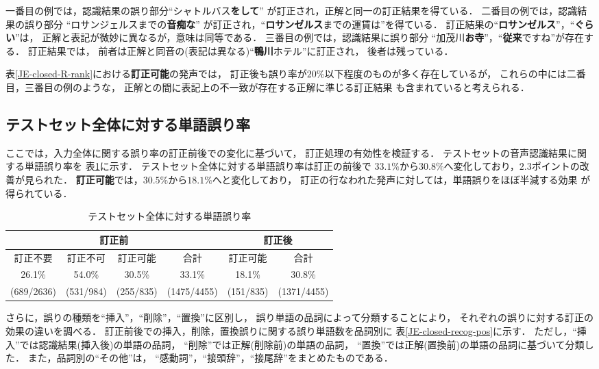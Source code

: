 一番目の例では，認識結果の誤り部分``シャトルバス{\bf をして}''
が訂正され，正解と同一の訂正結果を得ている．
二番目の例では，認識結果の誤り部分
``ロサンジェルスまでの{\bf 音痴な}''
が訂正され，``{\bf ロサンゼルス}までの運賃は''を得ている．
訂正結果の``{\bf ロサンゼルス}''，``{\bf ぐらい}''は，
正解と表記が微妙に異なるが，意味は同等である．
三番目の例では，認識結果に誤り部分
``加茂川{\bf お寺}''，``{\bf 従来}ですね''が存在する．
訂正結果では，
前者は正解と同音の(表記は異なる)``{\bf 鴨川}ホテル''に訂正され，
後者は残っている．

表\ref{JE-closed-R-rank}における{\bf 訂正可能}の発声では，
訂正後も誤り率が$20\%$以下程度のものが多く存在しているが，
これらの中には二番目，三番目の例のような，
正解との間に表記上の不一致が存在する正解に準じる訂正結果
も含まれていると考えられる．


\subsection{テストセット全体に対する単語誤り率}

ここでは，入力全体に関する誤り率の訂正前後での変化に基づいて，
訂正処理の有効性を検証する．
テストセットの音声認識結果に関する単語誤り率を
表\ref{JE-closed-dp-total}に示す．
テストセット全体に対する単語誤り率は訂正の前後で
$33.1\%$から$30.8\%$へ変化しており，$2.3$ポイントの改善が見られた．
{\bf 訂正可能}では，$30.5\%$から$18.1\%$へと変化しており，
訂正の行なわれた発声に対しては，単語誤りをほぼ半減する効果
が得られている．

\begin{table}
\begin{center}
\caption{テストセット全体に対する単語誤り率}
\begin{tabular}{|c|c|c||c||c||c|} \hline
\multicolumn{4}{|c||}{訂正前} & \multicolumn{2}{c|}{訂正後} \\ \hline
訂正不要  & 訂正不可 & 訂正可能 & 合計 & 訂正可能 & 合計 \\ \hline\hline
26.1\% & 54.0\% & 30.5\% & 33.1\% & 18.1\% & 30.8\% \\
(689/2636) & (531/984) & (255/835) & (1475/4455) & (151/835) & (1371/4455) \\ \hline
\end{tabular}
\label{JE-closed-dp-total}
\end{center}
\end{table}

さらに，誤りの種類を``挿入''，``削除''，``置換''に区別し，
誤り単語の品詞によって分類することにより，
それぞれの誤りに対する訂正の効果の違いを調べる．
訂正前後での挿入，削除，置換誤りに関する誤り単語数を品詞別に
表\ref{JE-closed-recog-pos}に示す．
ただし，``挿入''では認識結果(挿入後)の単語の品詞，
``削除''では正解(削除前)の単語の品詞，
``置換''では正解(置換前)の単語の品詞に基づいて分類した．
また，品詞別の``その他''は，
``感動詞''，``接頭辞''，``接尾辞''をまとめたものである．


